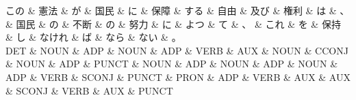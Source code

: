\documentclass[tikz,border=5pt]{standalone}
\begin{document}
\normalsize
\begin{dependency}[edge unit distance=12.0pt]
    \begin{deptext}[column sep=1em]
        この \& 憲法 \& が \& 国民 \& に \& 保障 \& する \& 自由 \& 及び \& 権利 \& は \& 、 \& 国民 \& の \& 不断 \& の \& 努力 \& に \& よつ \& て \& 、 \& これ \& を \& 保持 \& し \& なけれ \& ば \& なら \& ない \& 。\\
        DET \& NOUN \& ADP \& NOUN \& ADP \& VERB \& AUX \& NOUN \& CCONJ \& NOUN \& ADP \& PUNCT \& NOUN \& ADP \& NOUN \& ADP \& NOUN \& ADP \& VERB \& SCONJ \& PUNCT \& PRON \& ADP \& VERB \& AUX \& AUX \& SCONJ \& VERB \& AUX \& PUNCT\\
    \end{deptext}
\end{dependency}
\end{document}
